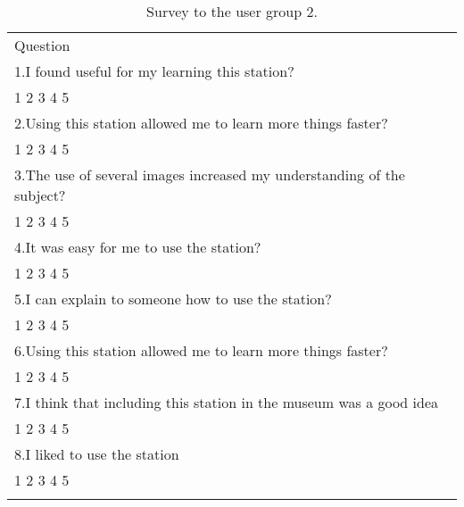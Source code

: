 \begin{table}
\small
\centering
\captionsetup{font=footnotesize}
\caption{Survey to the user group 2.}
\label{tab:users2} 

\small
\begin{tabular}{p{12cm}}
\hline\noalign{\smallskip} 
Question \\
\noalign{\smallskip}\hline\noalign{\smallskip}\hline
\small{1.I found useful for my learning this station? } \\ 
\small{	1			2			3			4			5	}\\\hline
\small{2.Using this station allowed me to learn more things faster? }  \\ 
\small{	1			2			3			4			5	}\\\hline
\small{3.The use of several images increased my understanding of the subject?  } \\ 
\small{	1			2			3			4			5	}\\\hline
\small{4.It was easy for me to use the station?   } \\ 
\small{	1			2			3			4			5	}\\\hline
\small{5.I can explain to someone how to use the station? } \\ 
\small{	1			2			3			4			5	}\\\hline
\small{6.Using this station allowed me to learn more things faster? }  \\ 
\small{	1			2			3			4			5	}\\\hline
\small{7.I think that including this station in the museum was a good idea  } \\ 
\small{	1			2			3			4			5	}\\\hline
\small{8.I liked to use the station   } \\   
\small{	1			2			3			4			5	}\\\hline
\noalign{\smallskip}\hline
\end{tabular}
\end{table}

